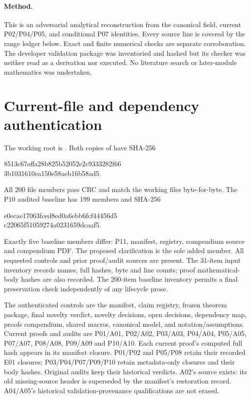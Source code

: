 \documentclass[11pt]{article}
\begin{document}
\paragraph{Method.}
This is an adversarial analytical reconstruction from the canonical field,
current P02/P04/P05, and conditional P07 identities. Every source line is
covered by the range ledger below. Exact and finite numerical checks are
separate corroboration. The developer validation package was inventoried
and hashed but its checker was neither read as a derivation nor executed.
No literature search or later-module mathematics was undertaken.

\section{Current-file and dependency authentication}
\label{sec:auth}
The working root is . Both copies of
 have SHA-256
\begin{center}\ttfamily\small
8513c67effa28b825b52052e2c9333282f66\\
3b1031610ea150e58aeb16b58ad5.
\end{center}
All 200 file members pass CRC and match the working files byte-for-byte.
The P10 audited baseline has 199 members and SHA-256
\begin{center}\ttfamily\small
e0ecae17063fced8ed0a6ebb6fcf44456d5\\
c22065f51059274a0231659dcaaf5.
\end{center}
Exactly five baseline members differ: P11, manifest, registry, compendium
source and compendium PDF. The proposed clarification is the sole added
member. All requested controls and prior proof/audit sources are present.
The 31-item input inventory records names, full hashes, byte and line
counts; proof mathematical-body hashes are also recorded. The 200-item
baseline inventory permits a final preservation check independently of
any lifecycle prose.

The authenticated controls are the manifest, claim registry, frozen theorem
package, final novelty verdict, novelty decisions, open decisions,
dependency map, proofs compendium, shared macros, canonical model, and
notation/assumptions. Current proofs and audits are P01/A01, P02/A02,
P03/A03, P04/A04, P05/A05, P07/A07, P08/A08, P09/A09 and P10/A10.
Each current proof's computed full hash appears in its manifest closure.
P01/P02 and P05/P08 retain their recorded E01 closures; P03/P04/P07/P09/P10
retain metadata-only closures and their body hashes. Original audits keep
their historical verdicts. A02's source exists: its old missing-source
header is superseded by the manifest's restoration record. A04/A05's
historical validation-provenance qualifications are not erased.
\end{document}
